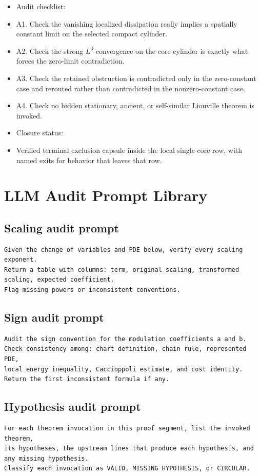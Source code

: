 \documentclass[11pt]{article}
\theoremstyle{plain}
\theoremstyle{definition}
\theoremstyle{remark}
\begin{document}
\begin{itemize}
  \item Audit checklist:
  \item A1. Check the vanishing localized dissipation really implies a spatially constant limit on the selected compact cylinder.
  \item A2. Check the strong $L^3$ convergence on the core cylinder is exactly what forces the zero-limit contradiction.
  \item A3. Check the retained obstruction is contradicted only in the zero-constant case and rerouted rather than contradicted in the nonzero-constant case.
  \item A4. Check no hidden stationary, ancient, or self-similar Liouville theorem is invoked.
  \item Closure status:
  \item Verified terminal exclusion capsule inside the local single-core row, with named exits for behavior that leaves that row.
\end{itemize}

\section{LLM Audit Prompt Library}
\label{app:prompt-library}

\subsection{Scaling audit prompt}
\begin{lstlisting}
Given the change of variables and PDE below, verify every scaling exponent.
Return a table with columns: term, original scaling, transformed scaling, expected coefficient.
Flag missing powers or inconsistent conventions.
\end{lstlisting}

\subsection{Sign audit prompt}
\begin{lstlisting}
Audit the sign convention for the modulation coefficients a and b.
Check consistency among: chart definition, chain rule, represented PDE,
local energy inequality, Caccioppoli estimate, and cost identity.
Return the first inconsistent formula if any.
\end{lstlisting}

\subsection{Hypothesis audit prompt}
\begin{lstlisting}
For each theorem invocation in this proof segment, list the invoked theorem,
its hypotheses, the upstream lines that produce each hypothesis, and any missing hypothesis.
Classify each invocation as VALID, MISSING HYPOTHESIS, or CIRCULAR.
\end{lstlisting}
\end{document}
